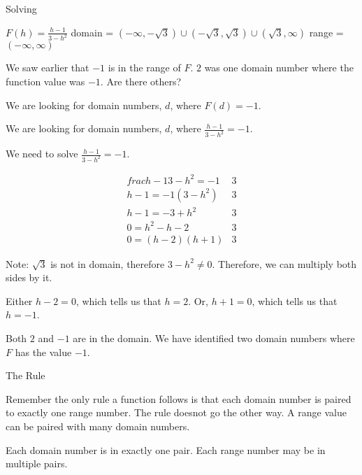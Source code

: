 \documentclass{ximera}
\begin{document}
\begin{example}   Solving

$F(h) = \frac{h-1}{3-h^2}$
domain = $(-\infty, -\sqrt{3}) \cup (-\sqrt{3}, \sqrt{3}) \cup (\sqrt{3}, \infty)$
range = $(-\infty, \infty)$


We saw earlier that $-1$ is in the range of $F$. $2$ was one domain number where the function value was $-1$. Are there others?


We are looking for domain numbers, $d$, where $F(d) = -1$.  

We are looking for domain numbers, $d$, where $\frac{h-1}{3-h^2} = -1$.  

We need to solve $\frac{h-1}{3-h^2} = -1$.



\[
\begin{array}{ll}
frac{h-1}{3-h^2} = -1 &  3\\
h - 1 = -1 (3 - h^2)    &  3 \\
h - 1 = -3 + h^2    &      3\\
0 = h^2 - h - 2    &      3\\
0 =(h-2)(h+1)    &   3   
\end{array}
\]


Note:  $\sqrt{3}$ is not in domain, therefore $3 - h^2 \ne 0$. Therefore, we can multiply both sides by it.  

Either $h-2 = 0$, which tells us that $h = 2$. Or, $h+1 = 0$, which tells us that $h = -1$.

Both $2$ and $-1$ are in the domain.  We have identified two domain numbers where $F$ has the value $-1$.



\end{example}



\begin{remark}  The Rule

Remember the only rule a function follows is that each domain number is paired to exactly one range number.  The rule doesnot go the other way.  A range value can be paired with many domain numbers.

Each domain number is in exactly one pair.
Each range number may be in multiple pairs.


\end{remark}
\end{document}
